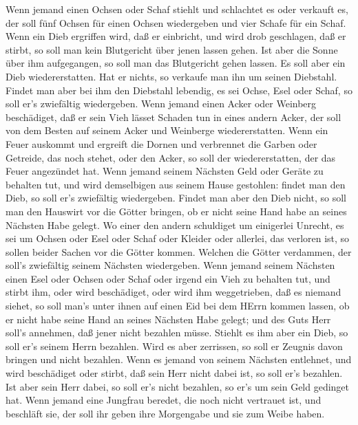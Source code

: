  Wenn jemand einen Ochsen oder Schaf stiehlt und schlachtet
es oder verkauft es, der soll fünf Ochsen für einen Ochsen wiedergeben
und vier Schafe für ein Schaf.  Wenn ein Dieb ergriffen
wird, daß er einbricht, und wird drob geschlagen, daß er stirbt, so soll
man kein Blutgericht über jenen lassen gehen.  Ist aber die
Sonne über ihm aufgegangen, so soll man das Blutgericht gehen lassen. Es
soll aber ein Dieb wiedererstatten. Hat er nichts, so verkaufe man ihn
um seinen Diebstahl.  Findet man aber bei ihm den Diebstahl
lebendig, es sei Ochse, Esel oder Schaf, so soll er's zwiefältig
wiedergeben.  Wenn jemand einen Acker oder Weinberg
beschädiget, daß er sein Vieh lässet Schaden tun in eines andern Acker,
der soll von dem Besten auf seinem Acker und Weinberge wiedererstatten.
 Wenn ein Feuer auskommt und ergreift die Dornen und
verbrennet die Garben oder Getreide, das noch stehet, oder den Acker, so
soll der wiedererstatten, der das Feuer angezündet hat. 
Wenn jemand seinem Nächsten Geld oder Geräte zu behalten tut, und wird
demselbigen aus seinem Hause gestohlen: findet man den Dieb, so soll
er's zwiefältig wiedergeben.  Findet man aber den Dieb
nicht, so soll man den Hauswirt vor die Götter bringen, ob er nicht
seine Hand habe an seines Nächsten Habe gelegt.  Wo einer
den andern schuldiget um einigerlei Unrecht, es sei um Ochsen oder Esel
oder Schaf oder Kleider oder allerlei, das verloren ist, so sollen
beider Sachen vor die Götter kommen. Welchen die Götter verdammen, der
soll's zwiefältig seinem Nächsten wiedergeben.  Wenn jemand
seinem Nächsten einen Esel oder Ochsen oder Schaf oder irgend ein Vieh
zu behalten tut, und stirbt ihm, oder wird beschädiget, oder wird ihm
weggetrieben, daß es niemand siehet,  so soll man's unter
ihnen auf einen Eid bei dem HErrn kommen lassen, ob er nicht habe seine
Hand an seines Nächsten Habe gelegt; und des Guts Herr soll's annehmen,
daß jener nicht bezahlen müsse.  Stiehlt es ihm aber ein
Dieb, so soll er's seinem Herrn bezahlen.  Wird es aber
zerrissen, so soll er Zeugnis davon bringen und nicht bezahlen.
 Wenn es jemand von seinem Nächsten entlehnet, und wird
beschädiget oder stirbt, daß sein Herr nicht dabei ist, so soll er's
bezahlen.  Ist aber sein Herr dabei, so soll er's nicht
bezahlen, so er's um sein Geld gedinget hat.  Wenn jemand
eine Jungfrau beredet, die noch nicht vertrauet ist, und beschläft sie,
der soll ihr geben ihre Morgengabe und sie zum Weibe haben.
